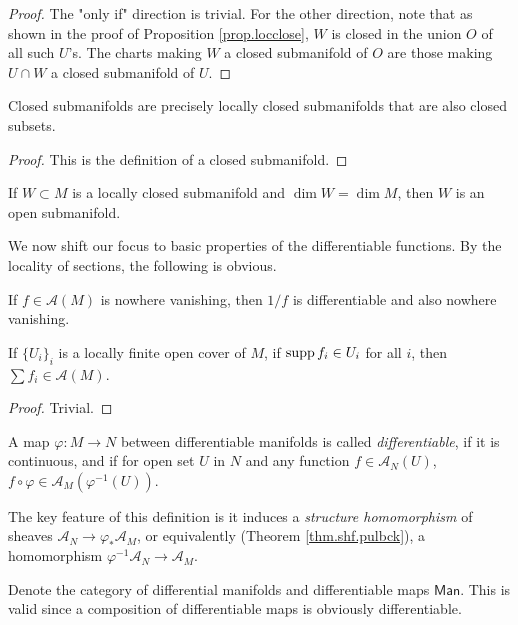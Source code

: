 \begin{proof}
    The "only if" direction is trivial. For the other direction, note that as shown in the proof of Proposition \ref{prop.locclose}, $W$ is closed in the union $O$ of all such $U$'s. The charts making $W$ a closed submanifold of $O$ are those making $U\cap W$ a closed submanifold of $U$.
\end{proof}

\begin{corollary}
    Closed submanifolds are precisely locally closed submanifolds that are also closed subsets.
\end{corollary}

\begin{proof}
    This is the definition of a closed submanifold.
\end{proof}

\begin{remark}
    If $W\subset M$ is a locally closed submanifold and $\dim W=\dim M$, then $W$ is an open submanifold.
\end{remark}

We now shift our focus to basic properties of the differentiable functions. By the locality of sections, the following is obvious.

\begin{proposition}
    If $f\in\mathcal{A}(M)$ is nowhere vanishing, then $1/f$ is differentiable and also nowhere vanishing.

    If $\{U_i\}_i$ is a locally finite open cover of $M$, if $\operatorname{supp} f_i\in U_i$ for all $i$, then $\sum f_i\in\mathcal{A}(M)$.
\end{proposition}

\begin{proof}
    Trivial.
\end{proof}

\begin{definition}
    A map $\varphi:M\to N$ between differentiable manifolds is called \emph{differentiable}, if it is continuous, and if for open set $U$ in $N$ and any function $f\in\mathcal{A}_N(U)$, $f\circ\varphi\in\mathcal{A}_M(\varphi^{-1}(U))$.

    The key feature of this definition is it induces a \emph{structure homomorphism} of sheaves $\mathcal{A}_N\to \varphi_*\mathcal{A}_M$, or equivalently (Theorem \ref{thm.shf.pulbck}), a homomorphism $\varphi^{-1}\mathcal{A}_N\to\mathcal{A}_M$.

    Denote the category of differential manifolds and differentiable maps $\mathsf{Man}$. This is valid since a composition of differentiable maps is obviously differentiable. 
\end{definition}


